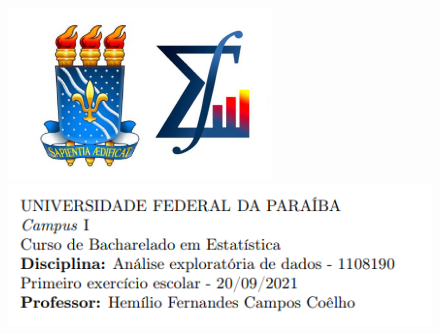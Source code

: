 \documentclass[12pt]{article}   %
\begin{document}
	
	\begin{figure}[h!]
		\includegraphics[scale=0.7]{ufpbde}
		\includegraphics[scale=0.7]{ufpbhemilio}
	\end{figure}
\end{document}

